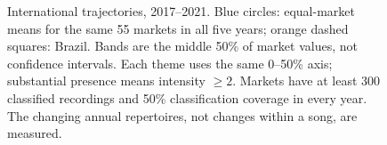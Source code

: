\documentclass[10pt,a4paper,twocolumn]{article}
\begin{document}
\begin{figure}[t]
\caption{International trajectories, 2017--2021. Blue circles: equal-market means for the same 55 markets in all five years; orange dashed squares: Brazil. Bands are the middle 50\% of market values, not confidence intervals. Each theme uses the same 0--50\% axis; substantial presence means intensity $\geq2$. Markets have at least 300 classified recordings and 50\% classification coverage in every year. The changing annual repertoires, not changes within a song, are measured.}
\label{fig:global-time}
\end{figure}
\end{document}
